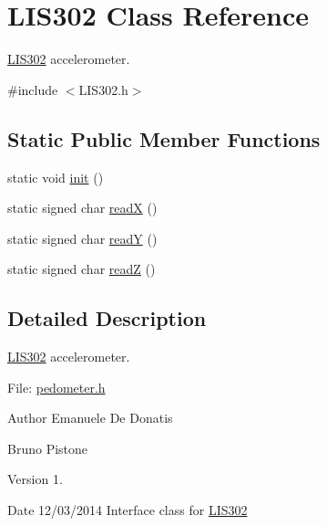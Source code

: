 \hypertarget{class_l_i_s302}{\section{L\-I\-S302 Class Reference}
\label{class_l_i_s302}
}


\hyperlink{class_l_i_s302}{L\-I\-S302} accelerometer.  




{\ttfamily \#include $<$L\-I\-S302.\-h$>$}

\subsection*{Static Public Member Functions}
\begin{DoxyCompactItemize}
\item 
static void \hyperlink{class_l_i_s302_ae17e47022db9b40e9254c689448e855c}{init} ()
\item 
static signed char \hyperlink{class_l_i_s302_afdf8ad38d5be4bb65e032a6a27a4139a}{read\-X} ()
\item 
static signed char \hyperlink{class_l_i_s302_a4300acbaf49847ce8fec1a2e068d4cca}{read\-Y} ()
\item 
static signed char \hyperlink{class_l_i_s302_ab3f757b4247eb59d3d2f0d756ade6e91}{read\-Z} ()
\end{DoxyCompactItemize}


\subsection{Detailed Description}
\hyperlink{class_l_i_s302}{L\-I\-S302} accelerometer. 

File\-: \hyperlink{pedometer_8h_source}{pedometer.\-h} \begin{DoxyAuthor}{Author}
Emanuele De Donatis 

Bruno Pistone 
\end{DoxyAuthor}
\begin{DoxyVersion}{Version}
1. 
\end{DoxyVersion}
\begin{DoxyDate}{Date}
12/03/2014 Interface class for \hyperlink{class_l_i_s302}{L\-I\-S302} 
\end{DoxyDate}


